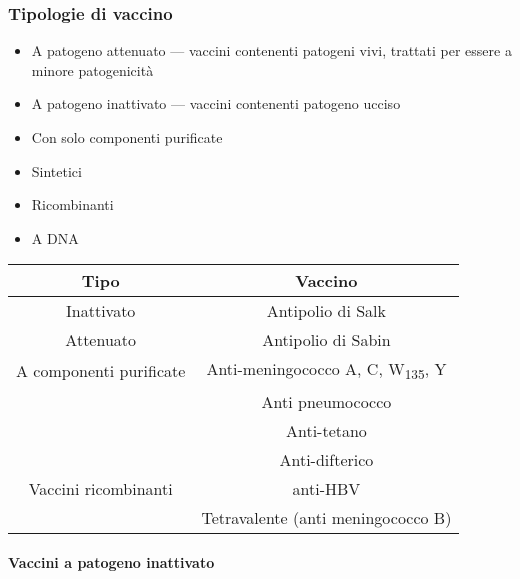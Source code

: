 \documentclass[italian,]{article}
\providecommand{\tightlist}{%
  \setlength{\itemsep}{0pt}\setlength{\parskip}{0pt}}
\begin{document}
\hypertarget{tipologie-di-vaccino}{%
\subsubsection{Tipologie di vaccino}\label{tipologie-di-vaccino}}

\begin{itemize}
\tightlist
\item
  A patogeno attenuato --- vaccini contenenti patogeni vivi, trattati
  per essere a minore patogenicità
\item
  A patogeno inattivato --- vaccini contenenti patogeno ucciso
\item
  Con solo componenti purificate
\item
  Sintetici
\item
  Ricombinanti
\item
  A DNA
\end{itemize}

\begin{longtable}[]{@{}cc@{}}
\toprule
Tipo & Vaccino\tabularnewline
\midrule
\endhead
Inattivato & Antipolio di Salk\tabularnewline
Attenuato & Antipolio di Sabin\tabularnewline
A componenti purificate & Anti-meningococco A, C, W\textsubscript{135},
Y\tabularnewline
& Anti pneumococco\tabularnewline
& Anti-tetano\tabularnewline
& Anti-difterico\tabularnewline
Vaccini ricombinanti & anti-HBV\tabularnewline
& Tetravalente (anti meningococco B)\tabularnewline
\bottomrule
\end{longtable}

\hypertarget{vaccini-a-patogeno-inattivato}{%
\paragraph{Vaccini a patogeno
inattivato}\label{vaccini-a-patogeno-inattivato}}
\end{document}
